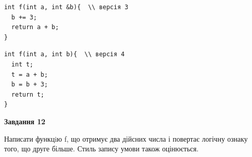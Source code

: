 \documentclass[12pt, ukrainian]{article}
\begin{document}
{\begin {large}
\begin{minipage}[t]{11.0cm}
\vspace{-8mm}\begin{verbatim}
int f(int a, int &b){  \\ версія 3
  b += 3;
  return a + b;
}
\end{verbatim}

\vspace{-8mm}\begin{verbatim}
int f(int a, int b){  \\ версія 4
  int t;
  t = a + b;
  b = b + 3;
  return t;
}
\end{verbatim}



\begin{center}
\textbf{Завдання 12}
\end{center}

Написати функцiю f, що отримує два дійсних числа і повертає логічну ознаку того, що друге більше. Стиль запису умови також оцінюється.\par

\end{minipage}

\end {large}}
\newpage
\end{document}
